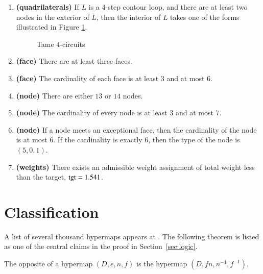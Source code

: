\begin{enumerate}
    \item {\bf (quadrilaterals)} If $L$ is a $4$-step contour loop, and there are at least two nodes
    in the exterior of $L$, then the interior of $L$ takes one of the forms
    illustrated in Figure
    \ref{fig:fourcircuit}.
    \label{definition:tame:4-circuit}
    \begin{figure}[htb]
        \centering
        \caption{Tame $4$-circuits}
        \label{fig:fourcircuit}
    \end{figure}
  \item {\bf (face)} There are at least three faces.
    \item {\bf (face)} The cardinality of each face is at least $3$ and at most $6$.
    \label{definition:tame:length}
    \item {\bf (node)} There are either $13$ or $14$ nodes.
    \item {\bf (node)} The cardinality of every node is at least $3$ and at most
    $7$.
    \label{definition:tame:degree}
    \item {\bf (node)} If a node meets an exceptional face,
        then the cardinality of the node is at most $6$.  If the
        cardinality is exactly $6$, then the type of the node
        is $(5,0,1)$.
    \label{definition:tame:degreeE}
    \item {\bf (weights)} There exists an admissible weight assignment
        of total weight less than the target, ${\operatorname{tgt}}=1.541$.
    \label{definition:tame:squander}
\end{enumerate}
%

\section{Classification}
    \label{sec:proof-classification}

\label{sec:classification}

A list of several thousand hypermaps appears at \cite{website:Hales:1998:Code}. The
following theorem is listed as one of the central claims in the
proof in Section~\ref{sec:logic}.

\begin{definition}[opposite] The opposite of a hypermap $(D,e,n,f)$ is the
hypermap $(D,f n,n^{-1},f^{-1})$.
\end{definition}

